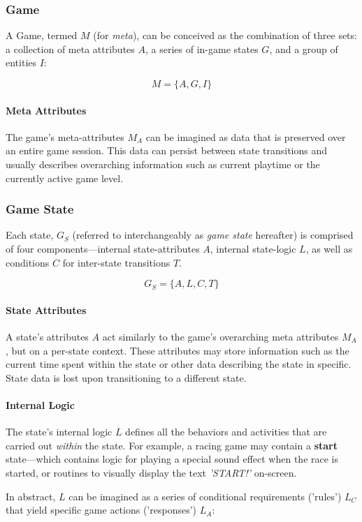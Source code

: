\documentclass{report}
\begin{document}
\subsubsection{Game}
A Game, termed $M$ (for \emph{meta}), can be conceived as the combination of three sets: a collection of meta attributes $A$, a series of in-game states $G$, and a group of entities $I$:

$$
M = \{A, G, I\}
$$

\paragraph{Meta Attributes}
The game's meta-attributes $M_A$ can be imagined as data that is preserved over an entire game session. This data can persist between state transitions and usually describes overarching information such as current playtime or the currently active game level. 

\subsubsection{Game State}
Each state, $G_S$ (referred to interchangeably as \textit{game state} hereafter) is comprised of four components---internal state-attributes $A$, internal state-logic $L$, as well as conditions $C$ for inter-state transitions $T$.

$$
G_S = \{ A, L, C, T \}
$$

\paragraph{State Attributes}
A state's attributes $A$ act similarly to the game's overarching meta attributes $M_A$, but on a per-state context. These attributes may store information such as the current time spent within the state or other data describing the state in specific. State data is lost upon transitioning to a different state.

\paragraph{Internal Logic}
The state's internal logic $L$ defines all the behaviors and activities that are carried out \textit{within} the state. For example, a racing game may contain a \textbf{start} state---which contains logic for playing a special sound effect when the race is started, or routines to visually display the text \textit{'START!'} on-screen. 

In abstract, $L$ can be imagined as a series of conditional requirements ('rules') $L_C$ that yield specific game actions ('responses') $L_A$:
\end{document}
